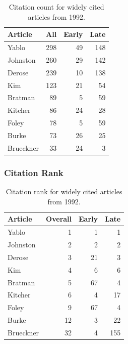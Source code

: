 \documentclass[
  10pt,
  letterpaper,
  DIV=11,
  numbers=noendperiod,
  twoside]{scrartcl}
\begin{document}
\begin{longtable}[]{@{}lrrr@{}}

\caption{\label{tbl-citation-count-1992}Citation count for widely cited
articles from 1992.}

\tabularnewline

\toprule\noalign{}
Article & All & Early & Late \\
\midrule\noalign{}
\endhead
\bottomrule\noalign{}
\endlastfoot
Yablo & 298 & 49 & 148 \\
Johnston & 260 & 29 & 142 \\
Derose & 239 & 10 & 138 \\
Kim & 123 & 21 & 54 \\
Bratman & 89 & 5 & 59 \\
Kitcher & 86 & 24 & 28 \\
Foley & 78 & 5 & 59 \\
Burke & 73 & 26 & 25 \\
Brueckner & 33 & 24 & 3 \\

\end{longtable}

\subsubsection*{Citation Rank}\label{sec-rank-1992}

\begin{longtable}[]{@{}lrrr@{}}

\caption{\label{tbl-citation-rank-1992}Citation rank for widely cited
articles from 1992.}

\tabularnewline

\toprule\noalign{}
Article & Overall & Early & Late \\
\midrule\noalign{}
\endhead
\bottomrule\noalign{}
\endlastfoot
Yablo & 1 & 1 & 1 \\
Johnston & 2 & 2 & 2 \\
Derose & 3 & 21 & 3 \\
Kim & 4 & 6 & 6 \\
Bratman & 5 & 67 & 4 \\
Kitcher & 6 & 4 & 17 \\
Foley & 9 & 67 & 4 \\
Burke & 12 & 3 & 22 \\
Brueckner & 32 & 4 & 155 \\

\end{longtable}
\end{document}

